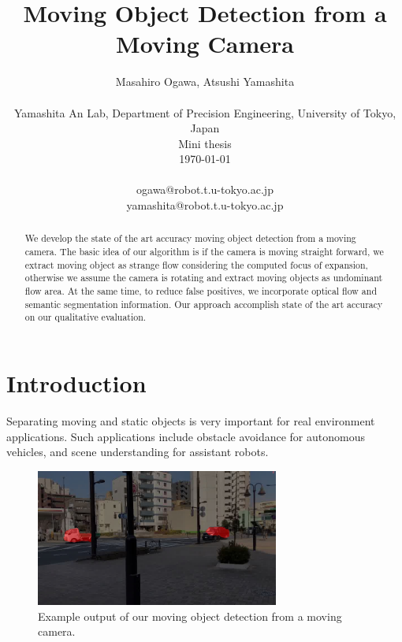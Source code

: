 \documentclass[10pt, twocolumn]{article}
\begin{document}
\title{Moving Object Detection from a Moving Camera}

\author{Masahiro Ogawa, Atsushi Yamashita \\
  \\
  Yamashita An Lab,
  Department of Precision Engineering,
  University of Tokyo, Japan\\
  Mini thesis\\
  \today
  \\
  \\
  ogawa@robot.t.u-tokyo.ac.jp\\
  yamashita@robot.t.u-tokyo.ac.jp}

\maketitle
\thispagestyle{empty}

\begin{abstract}
 We develop the state of the art accuracy moving object detection from a moving camera.
 The basic idea of our algorithm is if the camera is moving straight forward, we extract moving object as strange flow considering the computed focus of expansion, otherwise we assume the camera is rotating and extract moving objects as undominant flow area. At the same time, to reduce false positives, we incorporate optical flow and semantic segmentation information.
 Our approach accomplish state of the art accuracy on our qualitative evaluation.
\end{abstract}



\section{Introduction}
Separating moving and static objects is very important for real environment applications.
Such applications include obstacle avoidance for autonomous vehicles, and scene understanding for assistant robots.

\begin{figure}[ht]
  \centering
  \includegraphics[width=8cm]{fig/exampleoutput.jpg}
  \caption{Example output of our moving object detection from a moving camera.}
  \label{fig:exampleoutput}
\end{figure}
\end{document}
